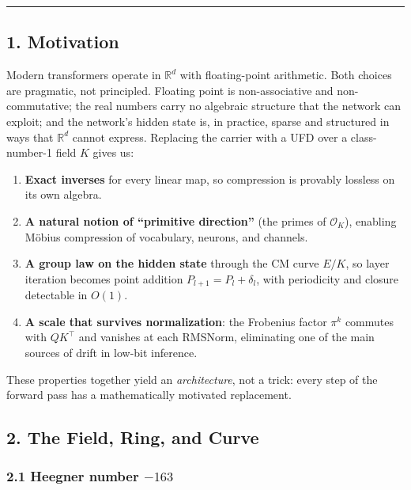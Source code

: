 \documentclass[
  11pt,
]{article}
\providecommand{\tightlist}{%
  \setlength{\itemsep}{0pt}\setlength{\parskip}{0pt}}
\begin{document}
\begin{center}\rule{0.5\linewidth}{0.5pt}\end{center}

\hypertarget{motivation}{%
\subsection{1. Motivation}\label{motivation}}

Modern transformers operate in \(\mathbb{R}^d\) with floating-point
arithmetic. Both choices are pragmatic, not principled. Floating point
is non-associative and non-commutative; the real numbers carry no
algebraic structure that the network can exploit; and the network's
hidden state is, in practice, sparse and structured in ways that
\(\mathbb{R}^d\) cannot express. Replacing the carrier with a UFD over a
class-number-1 field \(K\) gives us:

\begin{enumerate}
\def\labelenumi{\arabic{enumi}.}
\tightlist
\item
  \textbf{Exact inverses} for every linear map, so compression is
  provably lossless on its own algebra.
\item
  \textbf{A natural notion of ``primitive direction''} (the primes of
  \(\mathcal{O}_K\)), enabling Möbius compression of vocabulary,
  neurons, and channels.
\item
  \textbf{A group law on the hidden state} through the CM curve \(E/K\),
  so layer iteration becomes point addition
  \(P_{l+1} = P_l + \delta_l\), with periodicity and closure detectable
  in \(O(1)\).
\item
  \textbf{A scale that survives normalization}: the Frobenius factor
  \(\pi^k\) commutes with \(QK^\top\) and vanishes at each RMSNorm,
  eliminating one of the main sources of drift in low-bit inference.
\end{enumerate}

These properties together yield an \emph{architecture}, not a trick:
every step of the forward pass has a mathematically motivated
replacement.

\hypertarget{the-field-ring-and-curve}{%
\subsection{2. The Field, Ring, and
Curve}\label{the-field-ring-and-curve}}

\hypertarget{heegner-number--163}{%
\subsubsection{\texorpdfstring{2.1 Heegner number
\(-163\)}{2.1 Heegner number -163}}\label{heegner-number--163}}
\end{document}
